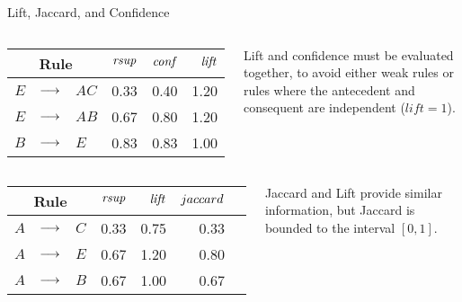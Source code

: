 \begin{frame}{Lift, Jaccard, and Confidence}
\begin{columns}
\begin{center}
\begin{tabular}{|r>{\centering}m{0.2in}l|r|r|r|}
\hline
\multicolumn{3}{|c|}{Rule} & $\mathit{rsup}$ & $\mathit{conf}$ & $\mathit{lift}$ \\ \hline
$\mathit{E}$ & $\arule$ & $\mathit{AC}$ & 0.33 & 0.40 & 1.20\\ \hline
$\mathit{E}$ & $\arule$ & $\mathit{AB}$ & 0.67 & 0.80 & 1.20\\ \hline
$\mathit{B}$ & $\arule$ & $\mathit{E}$ & 0.83 & 0.83 & 1.00\\ \hline
\end{tabular}
\end{center}

\begin{center}
\begin{minipage}{0.7\textwidth}
Lift and confidence must be evaluated together, to avoid either weak rules
or rules where the antecedent and consequent are independent ($lift=1$).

\end{minipage}
\end{center}

\end{columns}

\bigskip
	
\begin{columns}
\begin{center}
\begin{tabular}{|r>{\centering}m{0.2in}l|r|r|r|r|}
\hline
\multicolumn{3}{|c|}{Rule} & $\mathit{rsup}$ & $\mathit{lift}$ & $jaccard$\\ \hline
$\mathit{A}$ & $\arule$ & $\mathit{C}$ & 0.33 & 0.75 & 0.33 \\ \hline
$\mathit{A}$ & $\arule$ & $\mathit{E}$ & 0.67 & 1.20 & 0.80 \\ \hline
$\mathit{A}$ & $\arule$ & $\mathit{B}$ & 0.67 & 1.00 & 0.67 \\ \hline
\end{tabular}
\end{center}

\begin{center}
\begin{minipage}{0.7\textwidth}
Jaccard and Lift provide similar information, but Jaccard is bounded to the interval $[0,1]$.
\end{minipage}
\end{center}

\end{columns}
\end{frame}



